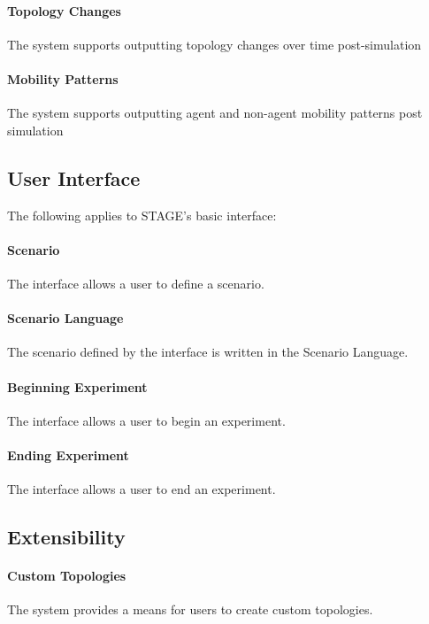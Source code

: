 \documentclass[titlepage]{article}
\begin{document}
	\paragraph{Topology Changes} The system supports outputting topology changes over time post-simulation
	\paragraph{Mobility Patterns} The system supports outputting agent and non-agent mobility patterns post simulation


\subsection{User Interface%
  \label{user-interface}%
}

The following applies to STAGE's basic interface:
    \paragraph{Scenario} The interface allows a user to define a scenario.
    \paragraph{Scenario Language} The scenario defined by the interface is written in the Scenario Language.
    \paragraph{Beginning Experiment} The interface allows a user to begin an experiment.
    \paragraph{Ending Experiment} The interface allows a user to end an experiment.


\subsection{Extensibility%
  \label{extensibility}%
}
    \paragraph{Custom Topologies} The system provides a means for users to create custom topologies.
\end{document}
